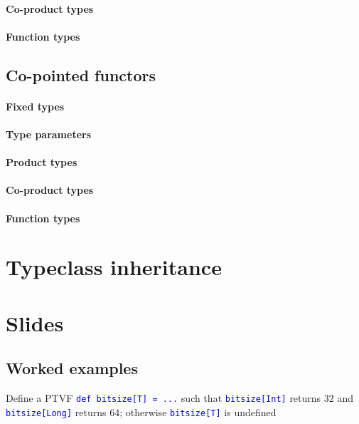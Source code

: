 \paragraph{Co-product types}

\paragraph{Function types}

\subsection{Co-pointed functors}

\paragraph{Fixed types}

\paragraph{Type parameters}

\paragraph{Product types}

\paragraph{Co-product types}

\paragraph{Function types}

\section{Typeclass inheritance}

\section{Slides }

\subsection{Worked examples}

Define a PTVF \texttt{\textcolor{blue}{\footnotesize{}def bitsize{[}T{]}
= ...}} such that \texttt{\textcolor{blue}{\footnotesize{}bitsize{[}Int{]}}}
returns $32$ and \texttt{\textcolor{blue}{\footnotesize{}bitsize{[}Long{]}}}
returns $64$; otherwise \texttt{\textcolor{blue}{\footnotesize{}bitsize{[}T{]}}}
is undefined

